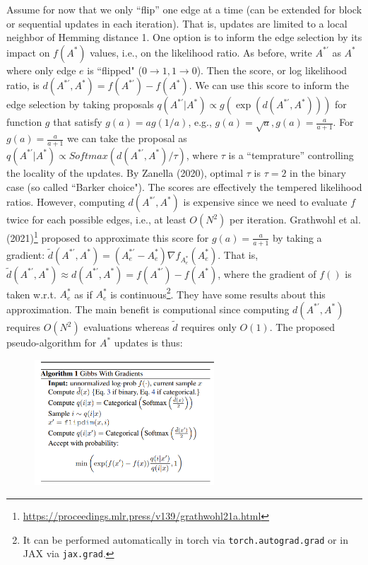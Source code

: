 \documentclass[12pt]{article}
\begin{document}
\begin{enumerate}
            Assume for now that we only ``flip'' one edge at a time 
            (can be extended for block or sequential updates in each iteration). 
            That is, updates are limited to a local neighbor of Hemming distance 1.
            One option is to inform the edge selection by its impact on $f(A^\ast)$ values,
            i.e., on the likelihood ratio.
            As before, write $A^{\ast'}$ as $A^\ast$ where only edge $e$ is ``flipped" ($0\to 1, 1\to 0$).
            Then the score, or log likelihood ratio, is $d(A^{\ast'},A^\ast) = f(A^{\ast'}) - f(A^\ast)$.
            We can use this score to inform the edge selection by taking proposals 
            $q(A^{\ast'} \vert A^\ast) \propto g(\exp(d(A^{\ast'},A^\ast)))$ for function 
            $g$ that satisfy $g(a) = a g(1/a)$, e.g., $g(a)=\sqrt{a}, g(a) = \frac{a}{a+1}$.
            For $g(a) = \frac{a}{a+1}$ we can take the proposal as 
            $q(A^{\ast'} \vert A^\ast) \propto Softmax(d(A^{\ast'},A^\ast)/\tau)$,
            where $\tau$ is a ``temprature'' controlling the locality of the updates. 
            By Zanella (2020), optimal $\tau$ is $\tau=2$ in the binary case (so called ``Barker choice").
            The scores are effectively the tempered likelihood ratios.
            However, computing $d(A^{\ast'},A^\ast)$ is expensive since we need to evaluate $f$ twice
            for each possible edges, i.e., at least $O(N^2)$ per iteration. 
            Grathwohl et al. (2021)\footnote{\url{https://proceedings.mlr.press/v139/grathwohl21a.html}}
            proposed to approximate this score for $g(a) = \frac{a}{a+1}$ by taking 
            a gradient:
            $\widetilde{d}(A^{\ast'},A^\ast) = (A^{\ast'}_e - A^{\ast}_e)\nabla f_{A^\ast_e}(A^\ast_e)$.
            That is, $\widetilde{d}(A^{\ast'},A^\ast) \approx d(A^{\ast'},A^\ast) = f(A^{\ast'}) - f(A^\ast)$,
            where the gradient of $f()$ is taken w.r.t. $A^\ast_e$ as if $A^\ast_e$ is 
            continuous\footnote{It can be performed automatically in torch via \texttt{torch.autograd.grad} or in 
            JAX via \texttt{jax.grad}.}.
            They have some results about this approximation.
            The main benefit is computional since computing $d(A^{\ast'},A^\ast)$ requires
            $O(N^2)$ evaluations whereas $\widetilde{d}$ requires only $O(1)$.
            The proposed pseudo-algorithm for $A^\ast$ updates is thus:

            \begin{figure}[!ht]
                \centering
                \includegraphics[width=0.6\textwidth]{gwg.png}
            \end{figure}


\end{enumerate}
\end{document}
